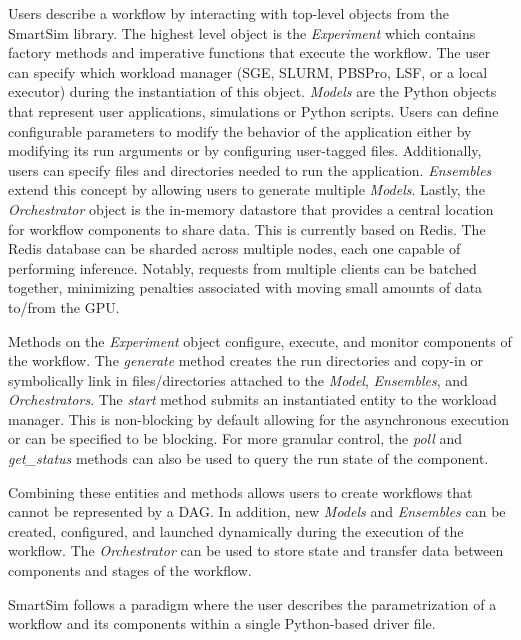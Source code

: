 \documentclass[utf8]{FrontiersinVancouver} %
\begin{document}
Users describe a workflow by interacting with top-level objects from the
SmartSim library. The highest level object is the {\em Experiment} which contains factory methods and imperative functions that execute the workflow. The user can
specify which workload manager (SGE, SLURM, PBSPro, LSF, or a local executor) during the instantiation of this object. {\em Models} are the Python objects that represent user applications, simulations or Python scripts. Users can define configurable parameters to modify the behavior of the application either by modifying its run arguments or by configuring user-tagged files. Additionally, users can specify files and directories needed to run the application. {\em Ensembles} extend this concept by allowing users to generate multiple {\em Models}. Lastly, the {\em Orchestrator} object is the in-memory datastore that provides a central location for workflow components to share data. This is currently based on Redis. The Redis database can be sharded across multiple nodes, each one capable of performing inference. Notably, requests from multiple clients can be batched together, minimizing penalties associated with
moving small amounts of data to/from the GPU.

Methods on the {\em Experiment} object configure, execute, and monitor components of the workflow. The {\em generate} method creates the run directories and copy-in or symbolically link in files/directories attached to the {\em Model},  {\em Ensembles}, and {\em Orchestrators}. The {\em start} method submits an instantiated entity to the workload manager. This is non-blocking by default allowing for the asynchronous execution or can be specified to be blocking. For more granular control, the {\em poll} and {\em get\_status} methods can also be used to query the run state of the component.

Combining these entities and methods allows users to create workflows that cannot be represented by a DAG. In addition, new {\em Models} and {\em Ensembles} can be created, configured, and launched dynamically during the execution of the workflow. The {\em Orchestrator} can be used to store state and transfer data between components and stages of the workflow.

SmartSim follows a paradigm where the user describes the parametrization of a workflow and its components within a single Python-based driver file.
\end{document}
